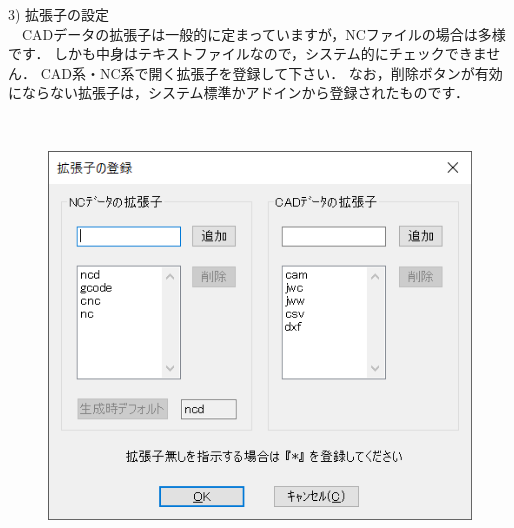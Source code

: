 \begin{minipage}[t]{0.48\textwidth}
3) 拡張子の設定\\
　CADデータの拡張子は一般的に定まっていますが，NCファイルの場合は多様です．
しかも中身はテキストファイルなので，システム的にチェックできません．
CAD系・NC系で開く拡張子を登録して下さい．
なお，削除ボタンが有効にならない拡張子は，システム標準かアドインから登録されたものです．
\end{minipage}
\begin{minipage}[t]{0.02\textwidth}
　
\end{minipage}
\begin{minipage}[t]{0.5\textwidth}
\vspace*{-2zh}
\begin{figure}[H]
\centering
\includegraphics[width=\textwidth]{No6/fig/ext.png}
\label{fig:ext.png}
\end{figure}
\end{minipage}
